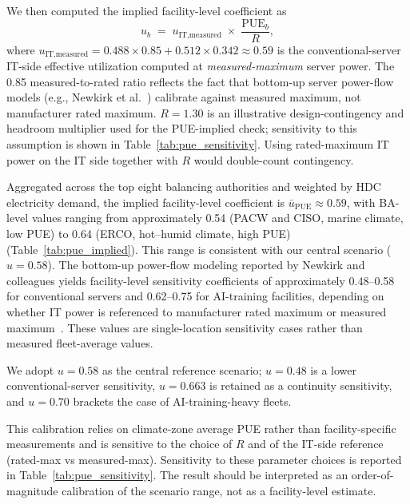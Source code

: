\documentclass[12pt]{article}
\begin{document}
We then computed the implied facility-level coefficient as
\begin{equation}
\label{eq:u_pue}
u_b \;=\; u_{\text{IT,measured}} \;\times\; \frac{\text{PUE}_b}{R} ,
\end{equation}
where $u_{\text{IT,measured}} = 0.488 \times 0.85 + 0.512 \times 0.342
\approx 0.59$ is the conventional-server IT-side effective utilization
computed at \emph{measured-maximum} server power. The 0.85 measured-to-rated
ratio reflects the fact that bottom-up server power-flow models (e.g.,
Newkirk et al.~\cite{newkirk2024microgrid}) calibrate against measured
maximum, not manufacturer rated maximum. $R=1.30$ is an illustrative design-contingency and headroom multiplier used for the PUE-implied check; sensitivity to this assumption is shown in Table~\ref{tab:pue_sensitivity}. Using rated-maximum IT power on the IT side together with $R$ would double-count contingency.

Aggregated across the top eight balancing authorities and weighted by HDC
electricity demand, the implied facility-level coefficient is
$\bar{u}_{\text{PUE}} \approx 0.59$, with BA-level values ranging from
approximately 0.54 (PACW and CISO, marine climate, low PUE) to 0.64 (ERCO,
hot--humid climate, high PUE) (Table~\ref{tab:pue_implied}). This range is
consistent with our central scenario ($u = 0.58$).
The bottom-up power-flow modeling reported by Newkirk and colleagues yields
facility-level sensitivity coefficients of approximately 0.48--0.58 for
conventional servers and 0.62--0.75 for AI-training facilities, depending
on whether IT power is referenced to manufacturer rated maximum or measured
maximum~\cite{newkirk2024microgrid}. These values are single-location sensitivity cases rather than measured fleet-average values.

We adopt $u = 0.58$ as the central reference scenario; $u = 0.48$ is a lower conventional-server sensitivity, $u = 0.663$ is retained as a continuity sensitivity, and $u = 0.70$ brackets the case of AI-training-heavy fleets.

This calibration relies on climate-zone average PUE rather than
facility-specific measurements and is sensitive to the choice of $R$ and
of the IT-side reference (rated-max vs measured-max). Sensitivity to
these parameter choices is reported in Table~\ref{tab:pue_sensitivity}.
The result should be interpreted as an order-of-magnitude calibration of
the scenario range, not as a facility-level estimate.
\end{document}
